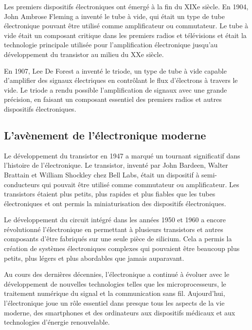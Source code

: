 Les premiers dispositifs électroniques ont émergé à la fin du XIXe siècle. En 1904, John Ambrose Fleming a inventé le tube à vide, qui était un type de tube électronique pouvant être utilisé comme amplificateur ou commutateur. Le tube à vide était un composant critique dans les premiers radios et télévisions et était la technologie principale utilisée pour l'amplification électronique jusqu'au développement du transistor au milieu du XXe siècle.

En 1907, Lee De Forest a inventé le triode, un type de tube à vide capable d'amplifier des signaux électriques en contrôlant le flux d'électrons à travers le vide. Le triode a rendu possible l'amplification de signaux avec une grande précision, en faisant un composant essentiel des premiers radios et autres dispositifs électroniques.

\subsection{L'avènement de l'électronique moderne}

Le développement du transistor en 1947 a marqué un tournant significatif dans l'histoire de l'électronique. Le transistor, inventé par John Bardeen, Walter Brattain et William Shockley chez Bell Labs, était un dispositif à semi-conducteurs qui pouvait être utilisé comme commutateur ou amplificateur. Les transistors étaient plus petits, plus rapides et plus fiables que les tubes électroniques et ont permis la miniaturisation des dispositifs électroniques.

Le développement du circuit intégré dans les années 1950 et 1960 a encore révolutionné l'électronique en permettant à plusieurs transistors et autres composants d'être fabriqués sur une seule pièce de silicium. Cela a permis la création de systèmes électroniques complexes qui pouvaient être beaucoup plus petits, plus légers et plus abordables que jamais auparavant.

Au cours des dernières décennies, l'électronique a continué à évoluer avec le développement de nouvelles technologies telles que les microprocesseurs, le traitement numérique du signal et la communication sans fil. Aujourd'hui, l'électronique joue un rôle essentiel dans presque tous les aspects de la vie moderne, des smartphones et des ordinateurs aux dispositifs médicaux et aux technologies d'énergie renouvelable.
